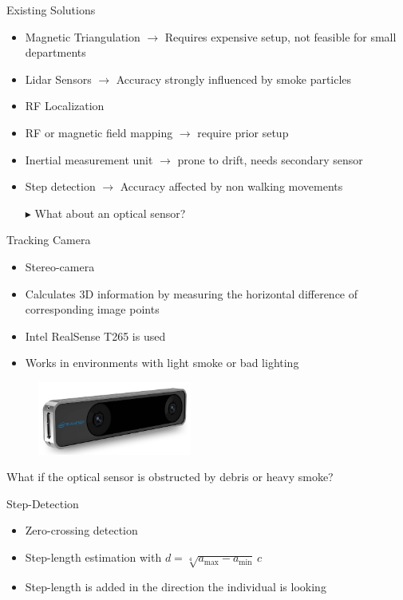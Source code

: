 \documentclass[aspectratio=169]{beamer}
\begin{document}
{	\begin{frame}{Existing Solutions}
		\begin{itemize}
			\item Magnetic Triangulation $\rightarrow$ Requires expensive setup, not feasible for small departments 
			\item Lidar Sensors $\rightarrow$ Accuracy strongly influenced by smoke particles
			\item RF Localization 
			\item RF or magnetic field mapping $\rightarrow$ require prior setup
			\item Inertial measurement unit $\rightarrow$ prone to drift, needs secondary sensor
			\item Step detection $\rightarrow$ Accuracy affected by non walking movements
			\item[$\blacktriangleright$] What about an optical sensor?
		\end{itemize}
	\end{frame}
	
	
	\begin{frame}{Tracking Camera}
		\begin{itemize}
			\item Stereo-camera
			\item Calculates 3D information by measuring the horizontal difference of corresponding image points
			\item Intel RealSense T265 is used
			\item Works in environments with light smoke or bad lighting
		\end{itemize}
		
		
		\begin{figure}
			\centering
			\includegraphics[width=0.45\textwidth]{realsense.jpg}
		\end{figure}
		
			\begin{block}{What if the optical sensor is obstructed by debris or heavy smoke?}
		\end{block}
	\end{frame}
	
	\begin{frame}{Step-Detection}
		\begin{itemize}
			\item Zero-crossing detection 
			\item Step-length estimation with $d = \sqrt[4]{a_{\max}-a_{\min}}  \, c$
			\item Step-length is added in the direction the individual is looking
		\end{itemize}
		

\end{frame}}
\end{document}
